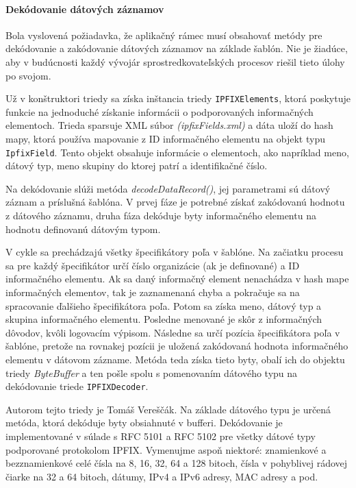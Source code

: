 \paragraph{Dekódovanie dátových záznamov} 
Bola vyslovená požiadavka, že aplikačný rámec musí obsahovať metódy pre dekódovanie a zakódovanie 
dátových záznamov na základe šablón. Nie je žiadúce, aby v budúcnosti každý vývojár sprostredkovateľských 
procesov riešil tieto úlohy po svojom. 

Už v konštruktori triedy sa získa inštancia triedy \verb|IPFIXElements|, ktorá poskytuje 
funkcie na jednoduché získanie informácii o podporovaných informačných elementoch. Trieda sparsuje XML 
súbor \emph{(ipfixFields.xml)} a dáta uloží do hash mapy, ktorá používa mapovanie z ID informačného 
elementu na objekt typu \verb|IpfixField|. Tento objekt obsahuje informácie o elementoch, ako 
napríklad meno, dátový typ, meno skupiny do ktorej patrí a identifikačné číslo.\citep{veri}

Na dekódovanie slúži metóda \emph{decodeDataRecord()}, jej parametrami sú dátový záznam a príslušná
šablóna. V prvej fáze je potrebné získať zakódovanú hodnotu z dátového záznamu, druha fáza dekóduje 
byty informačného elementu na hodnotu definovanú dátovým typom.

V cykle sa prechádzajú všetky špecifikátory poľa v šablóne. Na začiatku procesu sa pre každý 
špecifikátor určí číslo organizácie (ak je definované) a ID informačného elementu. Ak sa daný informačný
element nenachádza v hash mape informačných elementov, tak je zaznamenaná chyba a pokračuje sa 
na spracovanie ďalšieho špecifikátora poľa. Potom sa získa meno, dátový typ a skupina informačného elementu. 
Posledne menované je skôr z informačných dôvodov, kvôli logovacím výpisom. Následne sa určí pozícia 
špecifikátora poľa v šablóne, pretože na rovnakej pozícii je uložená zakódovaná hodnota informačného
elementu v dátovom zázname. Metóda teda získa tieto byty, obalí ich do objektu triedy \emph{ByteBuffer}  
a ten pošle spolu s pomenovaním dátového typu na dekódovanie triede \verb|IPFIXDecoder|.

Autorom tejto triedy je Tomáš Vereščák. Na základe dátového typu je určená metóda, ktorá dekóduje 
byty obsiahnuté v bufferi. Dekódovanie je implementované v súlade s RFC 5101 \citep{rfc5101} a 
RFC 5102 \citep{rfc5102} pre všetky dátové typy podporované protokolom IPFIX. Vymenujme aspoň niektoré:
znamienkové a bezznamienkové celé čísla na 8, 16, 32, 64 a 128 bitoch, čísla v pohyblivej rádovej čiarke na 
32 a 64 bitoch, dátumy, IPv4 a IPv6 adresy, MAC adresy a pod. 

